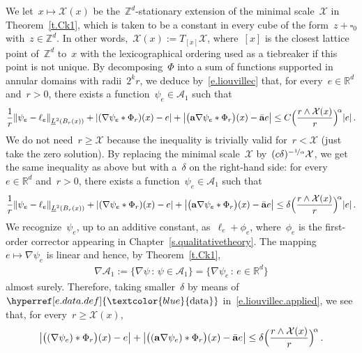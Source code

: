 \documentclass[11pt,twoside]{article} %
\let\oldsquare\square %
\renewcommand{\square}{\oldsquare}
\numberwithin{equation}{section}
\theoremstyle{definition}
\newcommand{\dataref}{\hyperref[e.data.def]{\textcolor{blue}{\ensuremath{\mathrm{data}}}}}
\let\originalleft\left
\let\originalright\right
\renewcommand{\left}{\mathopen{}\mathclose\bgroup\originalleft}
\renewcommand{\right}{\aftergroup\egroup\originalright}
\newcommand*{\R}{\ensuremath{\mathbb{R}}}
\newcommand*{\Zd}{\ensuremath{\mathbb{Z}^d}}
\renewcommand{\a}{\mathbf{a}}
\newcommand{\ahom}{\bar{\a}}
\newcommand{\cu}{\square}
\newcommand{\X}{\mathcal{X}}
\newcommand{\A}{\mathcal{A}}
\begin{document}
We let~$x \mapsto \X(x)$ be the~$\Zd$-stationary extension of the minimal scale~$\X$ in Theorem~\ref{t.Ck1}, which is taken to be a constant in every cube of the form~$z+\cu_0$ with~$z\in \Zd$. In other words,~$\X(x):= T_{[x]}\X$, where~$[x]$ is the closest lattice point of~$\Zd$ to~$x$ with the lexicographical ordering used as a tiebreaker if this point is not unique.
By decomposing~$\Phi$ into a sum of functions supported in annular domains with radii~$2^k r$, 
we deduce by~\eqref{e.liouvillec} that, for every~$e \in \R^d$ and~$r> 0$, there exists a function~$\psi_e \in \A_1$ such that
\begin{equation*} %
\frac1r \left\| \psi_e  -  \ell_e \right\|_{\underline{L}^2(B_r(x))} 
+
 | (\nabla \psi_e \ast \Phi_r)(x) - e | 
+
\left|  \bigl( \a \nabla \psi_e \ast \Phi_r \bigr)(x) - \ahom e \right|
\leq 
C\Bigl( \frac{r \wedge \X(x)} {r}\Bigr)^{\! \alpha} |e|
\,.
\end{equation*}
We do not need~$r\geq \X$ because the inequality is trivially valid for~$r<\X$ (just take the zero solution). 
By replacing the minimal scale~$\X$ by~$(c \delta)^{-\nicefrac 1\alpha}\X$, we get the same inequality as above but with a~$\delta$ on the right-hand side:
for every~$e \in \R^d$ and~$r>0$, there exists a function~$\psi_e \in \A_1$ such that
\begin{equation} \label{e.liouvillec.applied}
\frac1r \left\| \psi_e  -  \ell_e \right\|_{\underline{L}^2(B_r(x))} 
+
 | (\nabla \psi_e \ast \Phi_r)(x) - e | 
+
\left|  \bigl( \a \nabla \psi_e \ast \Phi_r \bigr)(x) - \ahom e \right|
\leq 
\delta \Bigl( \frac{r \wedge \X(x)} {r}\Bigr)^{\! \alpha} |e|
\,.
\end{equation}
We recognize~$\psi_e$, up to an additive constant, as~$\ell_e + \phi_e$, where~$\phi_e$ is the first-order corrector appearing in Chapter~\ref{s.qualitativetheory}. The mapping~$e \mapsto \nabla \psi_e$ is linear and hence, by Theorem~\ref{t.Ck1},
\begin{align}  \label{e.gradA1}
\nabla \A_1 := \{ \nabla \psi \, : \, \psi \in \A_1 \} = \{ \nabla \psi_e \, : \, e \in \R^d \}
\end{align}
almost surely.  Therefore, taking smaller~$\delta$ by means of~$\dataref$ in~\eqref{e.liouvillec.applied},
we see that, for every~$r \geq \X(x)$, 
\begin{equation} 
\label{e.b.representation}
\bigl| \bigl((\nabla \psi_{e}) \ast \Phi_{r}\bigr)(x)   - e \bigr| 
+ 
\bigl| \bigl( (\a \nabla \psi_{e}) \ast \Phi_{r}\bigr)(x)  -\ahom e \bigr| 
\leq 
\delta \Bigl( \frac{r \wedge \X(x)} {r}\Bigr)^{\! \alpha} 
\,.
\end{equation}
\end{document}
